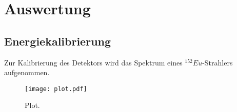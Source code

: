 \section{Auswertung}
\label{sec:Auswertung}

\subsection{Energiekalibrierung}

Zur Kalibrierung des Detektors wird das Spektrum eines $^152Eu$-Strahlers aufgenommen.


\begin{figure}
  \centering
  \texttt{[image: plot.pdf]}
  \caption{Plot.}
  \label{fig:plot}
\end{figure}
